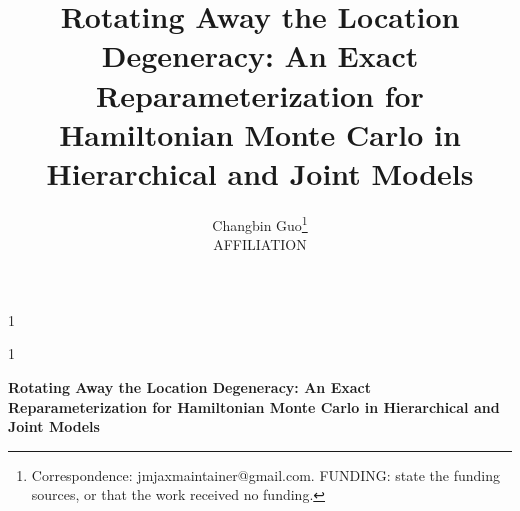 \documentclass[12pt]{article}
\theoremstyle{definition}
\newcommand{\anon}{1}
\newcommand{\papertitle}{Rotating Away the Location Degeneracy: An Exact
Reparameterization for Hamiltonian Monte Carlo in Hierarchical and Joint
Models}
\begin{document}
\def\spacingset#1{\renewcommand{\baselinestretch}%
{#1}\small\normalsize} \spacingset{1}

\anon
{
  \title{\bf \papertitle}
  \author{Changbin Guo\thanks{
    Correspondence: jmjaxmaintainer@gmail.com. FUNDING: state the funding
    sources, or that the work received no funding.}\hspace{.2cm}\\
    AFFILIATION}
  \date{}
  \maketitle
} \fi

\anon
{
  \bigskip
  \bigskip
  \bigskip
  \begin{center}
    {\LARGE\bf \papertitle}
  \end{center}
  \medskip
} \fi

\bigskip

\vfill

\newpage
\spacingset{1.8} %















\appendix

\end{document}
